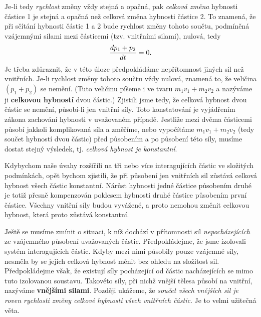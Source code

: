     Je-li tedy \emph{rychlost} změny vždy stejná a opačná, pak \emph{celková změna} hybnosti 
    částice 1 je stejná a opačná než celková změna hybnosti částice 2. To znamená, že při sčítání 
    hybnosti částic 1 a 2 bude rychlost změny tohoto součtu, podmíněná vzájemnými silami mezi 
    částicemi (tzv. vnitřními silami), nulová, tedy
    \begin{equation}\label{FYZ:eq137}
      \dfrac{d p_1+p_2}{d t} = 0.
    \end{equation}
    Je třeba zdůraznit, že v této úloze předpokládáme nepřítomnost jiných sil než vnitřních. Je-li 
    rychlost změny tohoto součtu vždy nulová, znamená to, že veličina \((p_1 + p_2)\) se nemění. 
    (Tuto veličinu píšeme i ve tvaru \(m_1v_1 + m_2v_2\) a nazýváme ji \textbf{celkovou hybností} 
    dvou částic.) Zjistili jsme tedy, že celková hybnost dvou částic se nemění, působí-li jen 
    vnitřní síly. Toto konstatování je vyjádřením zákona zachování hybnosti v uvažovaném případě. 
    Jestliže mezi dvěma částicemi působí jakkoli komplikovaná síla a změříme, nebo vypočítáme 
    \(m_1v_1 + m_2v_2\) (tedy součet hybností dvou částic) před působením a po působení této síly, 
    musíme dostat stejný výsledek, tj. \emph{celková hybnost je konstantní}.
    
    Kdybychom naše úvahy rozšířili na tři nebo více interagujících částic ve složitých podmínkách, 
    opět bychom zjistili, že při působení jen vnitřních sil zůstává celková hybnost všech částic 
    konstantní. Nárůst hybnosti jedné částice působením druhé je totiž přesně kompenzován poklesem 
    hybnosti druhé částice působením první částice. Všechny vnitřní síly budou vyvážené, a proto 
    nemohou změnit celkovou hybnost, která proto zůstává konstantní.
    
    Ještě se musíme zmínit o situaci, k níž dochází v přítomnosti sil \emph{nepocházejících} ze 
    vzájemného působení uvažovaných částic. Předpokládejme, že jsme izolovali systém interagujících 
    částic. Kdyby mezi nimi působily pouze vzájemné síly, nesměla by se jejich celková hybnost 
    měnit bez ohledu na složitost sil. Předpokládejme však, že existují síly pocházející od částic 
    nacházejících se mimo tuto izolovanou soustavu. Takovéto síly, při nichž vnější tělesa působí 
    na vnitřní, nazýváme \textbf{vnějšími silami}. Později ukážeme, že \emph{součet všech vnějších 
    sil je roven rychlosti změny celkové hybnosti všech vnitřních částic}. Je to velmi užitečná 
    věta.
    
